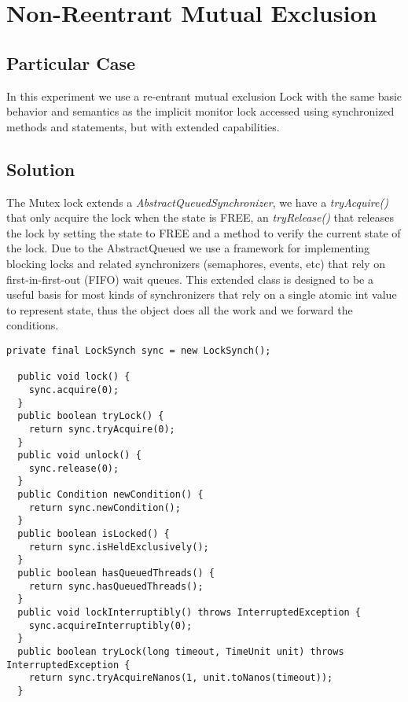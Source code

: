 


\section{\textbf{Non-Reentrant Mutual Exclusion}}



\subsection{Particular Case}
\par
In this experiment we use a re-entrant mutual exclusion Lock with the same basic behavior and semantics as the implicit monitor lock accessed using synchronized methods and statements, but with extended capabilities.
\par



\subsection{Solution}
\par
The Mutex lock extends a \textit{AbstractQueuedSynchronizer}, we have a \textit{tryAcquire()} that only acquire the lock when the state is FREE, an \textit{tryRelease()} that releases the lock by setting the state to FREE and a method to verify the current state of the lock. Due to the AbstractQueued we use a framework for implementing blocking locks and related synchronizers (semaphores, events, etc) that rely on first-in-first-out (FIFO) wait queues. This extended class is designed to be a useful basis for most kinds of synchronizers that rely on a single atomic int value to represent state, thus the object does all the work and we forward the conditions. 
\par
\begin{lstlisting}[frame=single,breaklines=true]
  private final LockSynch sync = new LockSynch();
  
  public void lock() {
    sync.acquire(0);
  }
  public boolean tryLock() {
    return sync.tryAcquire(0);
  }
  public void unlock() {
    sync.release(0);
  }
  public Condition newCondition() {
    return sync.newCondition();
  }
  public boolean isLocked() {
    return sync.isHeldExclusively();
  }
  public boolean hasQueuedThreads() {
    return sync.hasQueuedThreads();
  }
  public void lockInterruptibly() throws InterruptedException {
    sync.acquireInterruptibly(0);
  }
  public boolean tryLock(long timeout, TimeUnit unit) throws InterruptedException {
    return sync.tryAcquireNanos(1, unit.toNanos(timeout));
  }
\end{lstlisting}


